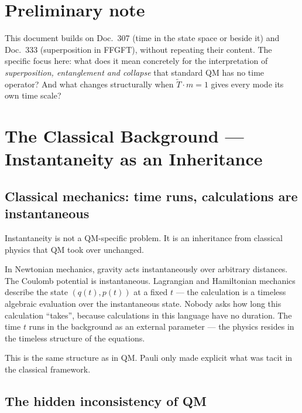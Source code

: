 
\section*{Preliminary note}

This document builds on Doc.~307 (time in the state space or beside
it) and Doc.~333 (superposition in FFGFT), without repeating their
content. The specific focus here: what does it mean concretely for
the interpretation of \emph{superposition, entanglement and collapse}
that standard QM has no time operator? And what changes structurally
when $\tilde{T}\cdot m=1$ gives every mode its own time scale?

\section{The Classical Background — Instantaneity as an Inheritance}

\subsection{Classical mechanics: time runs, calculations are instantaneous}

Instantaneity is not a QM-specific problem. It is an inheritance
from classical physics that QM took over unchanged.

In Newtonian mechanics, gravity acts instantaneously over arbitrary
distances. The Coulomb potential is instantaneous. Lagrangian and
Hamiltonian mechanics describe the state $(q(t),p(t))$ at a fixed
$t$ — the calculation is a timeless algebraic evaluation over the
instantaneous state. Nobody asks how long this calculation
``takes'', because calculations in this language have no duration.
The time $t$ runs in the background as an external parameter —
the physics resides in the timeless structure of the equations.

This is the same structure as in QM. Pauli only made explicit what
was tacit in the classical framework.

\subsection{The hidden inconsistency of QM}


